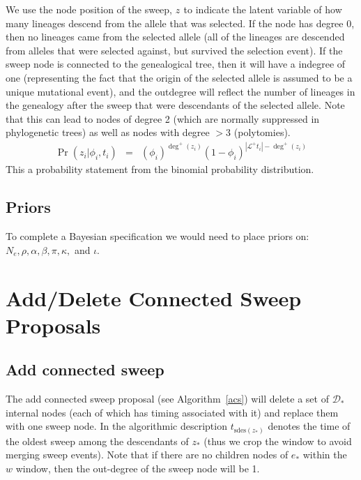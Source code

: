 \documentclass[letterpaper]{article}
\newcommand{\sweeptime}[1]{{\ensuremath{t_{#1}}}}
\newcommand{\sweepfreq}[1]{{\ensuremath{\phi_{#1}}}}
\newcommand{\sweeploc}[1]{{\ensuremath{z_{#1}}}}
\newcommand{\popsize}{{\ensuremath{N_e}}}
\newcommand{\ratesweep}{{\ensuremath{\rho}}}
\newcommand{\sweepalpha}{{\ensuremath{\alpha}}}
\newcommand{\sweepbeta}{{\ensuremath{\beta}}}
\newcommand{\basefreqs}{{\ensuremath{\pi}}}
\newcommand{\pinvar}{{\ensuremath{\iota}}}
\newcommand{\lineagesAfter}{{\ensuremath{\mathcal{L}^{+}}}}
\newcommand{\outdegree}[1]{{\ensuremath{\deg^{+}\left(#1\right)}}}
\begin{document}
We use the node position of the sweep, $\sweeploc{}$ to indicate the latent variable of how many lineages descend from the allele that was selected.
If the node has degree 0, then no lineages came from the selected allele (all of the lineages are descended from alleles that were selected against, but survived the selection event).
If the sweep node is connected to the genealogical tree, then it will have a indegree of one (representing the fact that the origin of the selected allele is assumed to be a unique mutational event), and the outdegree will reflect the number of lineages in the genealogy after the sweep that were descendants of the selected allele.
Note that this can lead to nodes of degree 2 (which are normally suppressed in phylogenetic trees) as well as nodes with degree $> 3$ (polytomies).
\begin{eqnarray}
	\Pr\left(\sweeploc{i}|\sweepfreq{i},\sweeptime{i}\right) & = & \left(\sweepfreq{i}\right)^{\outdegree{\sweeploc{i}}}\left(1-\sweepfreq{i}\right)^{|\lineagesAfter{\sweeptime{i}}| - \outdegree{\sweeploc{i}}} 
\end{eqnarray}
This  a  probability statement from the binomial probability distribution.

\subsection{Priors}
To complete a Bayesian specification we would need to place priors on: $\popsize, \ratesweep, \sweepalpha, \sweepbeta, \basefreqs, \kappa,$ and $\pinvar$.


\section{Add/Delete Connected Sweep Proposals}
\subsection{Add connected sweep}
The add connected sweep proposal (see Algorithm~\ref{acs}) will delete a set of $\mathcal{D}_{*}$ internal nodes (each of which has timing associated with it) and replace them with one sweep node.
In the algorithmic description $\sweeptime{\mbox{sdes}(z_{*})}$ denotes the time of the oldest sweep among the descendants of $z_{*}$ (thus we crop the window to avoid merging sweep events).
Note that if there are no children nodes of $e_{*}$ within the $w$ window, then the out-degree of the sweep node
will be 1.
\end{document}
